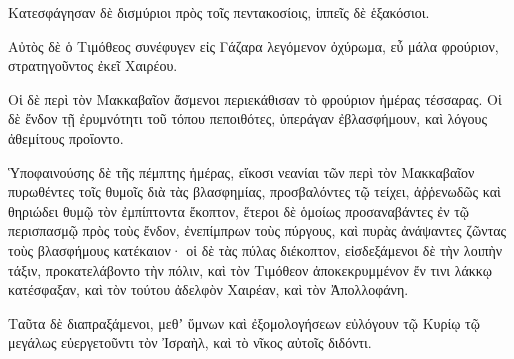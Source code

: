 {Κατεσφάγησαν δὲ δισμύριοι πρὸς τοῖς πεντακοσίοις, ἱππεῖς δὲ ἑξακόσιοι.
\par }{\PP {}Αὐτὸς δὲ ὁ Τιμόθεος συνέφυγεν εἰς Γάζαρα λεγόμενον ὀχύρωμα, εὖ μάλα φρούριον, στρατηγοῦντος ἐκεῖ Χαιρέου.
\par }{\PP {}Οἱ δὲ περὶ τὸν Μακκαβαῖον ἄσμενοι περιεκάθισαν τὸ φρούριον ἡμέρας τέσσαρας.
Οἱ δὲ ἔνδον τῇ ἐρυμνότητι τοῦ τόπου πεποιθότες, ὑπεράγαν ἐβλασφήμουν, καὶ λόγους ἀθεμίτους προΐοντο.
\par }{\PP {}Ὑποφαινούσης δὲ τῆς πέμπτης ἡμέρας, εἴκοσι νεανίαι τῶν περὶ τὸν Μακκαβαῖον πυρωθέντες τοῖς θυμοῖς διὰ τὰς βλασφημίας, προσβαλόντες τῷ τείχει, ἀῤῥενωδῶς καὶ θηριώδει θυμῷ τὸν ἐμπίπτοντα ἔκοπτον,
ἕτεροι δὲ ὁμοίως προσαναβάντες ἐν τῷ περισπασμῷ πρὸς τοὺς ἔνδον, ἐνεπίμπρων τοὺς πύργους, καὶ πυρὰς ἀνάψαντες ζῶντας τοὺς βλασφήμους κατέκαιον· οἱ δὲ τὰς πύλας διέκοπτον, εἰσδεξάμενοι δὲ τὴν λοιπὴν τάξιν, προκατελάβοντο τὴν πόλιν,
καὶ τὸν Τιμόθεον ἀποκεκρυμμένον ἔν τινι λάκκῳ κατέσφαξαν, καὶ τὸν τούτου ἀδελφὸν Χαιρέαν, καὶ τὸν Ἀπολλοφάνη.
\par }{\PP {}Ταῦτα δὲ διαπραξάμενοι, μεθʼ ὕμνων καὶ ἐξομολογήσεων εὐλόγουν τῷ Κυρίῳ τῷ μεγάλως εὐεργετοῦντι τὸν Ἰσραὴλ, καὶ τὸ νῖκος αὐτοῖς διδόντι.

}
